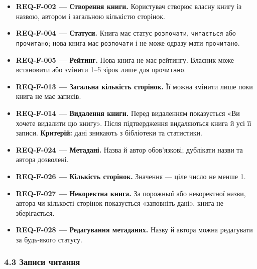 \documentclass[
]{article}
\providecommand{\tightlist}{%
  \setlength{\itemsep}{0pt}\setlength{\parskip}{0pt}}
\begin{document}
\begin{itemize}
\tightlist
\item
  \textbf{REQ-F-002 --- Створення книги.} Користувач створює власну
  книгу із назвою, автором і загальною кількістю сторінок.
\item
  \textbf{REQ-F-004 --- Статуси.} Книга має статус \texttt{розпочати},
  \texttt{читається} або \texttt{прочитано}; нова книга має
  \texttt{розпочати} і не може одразу мати \texttt{прочитано}.
\item
  \textbf{REQ-F-005 --- Рейтинг.} Нова книга не має рейтингу. Власник
  може встановити або змінити 1--5 зірок лише для \texttt{прочитано}.
\item
  \textbf{REQ-F-013 --- Загальна кількість сторінок.} Її можна змінити
  лише поки книга не має записів.
\item
  \textbf{REQ-F-014 --- Видалення книги.} Перед видаленням показується
  «Ви хочете видалити цю книгу». Після підтвердження видаляються книга й
  усі її записи. \textbf{Критерій:} дані зникають з бібліотеки та
  статистики.
\item
  \textbf{REQ-F-024 --- Метадані.} Назва й автор обов'язкові; дублікати
  назви та автора дозволені.
\item
  \textbf{REQ-F-026 --- Кількість сторінок.} Значення --- ціле число не
  менше 1.
\item
  \textbf{REQ-F-027 --- Некоректна книга.} За порожньої або некоректної
  назви, автора чи кількості сторінок показується «заповніть дані»,
  книга не зберігається.
\item
  \textbf{REQ-F-028 --- Редагування метаданих.} Назву й автора можна
  редагувати за будь-якого статусу.
\end{itemize}

\hypertarget{43-ux437ux430ux43fux438ux441ux438-ux447ux438ux442ux430ux43dux43dux44f}{%
\subsubsection{4.3 Записи
читання}\label{43-ux437ux430ux43fux438ux441ux438-ux447ux438ux442ux430ux43dux43dux44f}}
\end{document}
